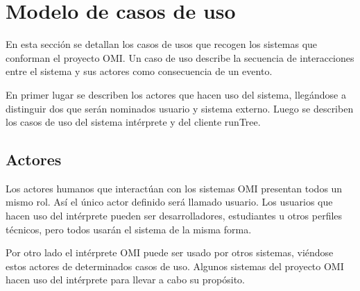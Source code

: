 \section{Modelo de casos de uso}
En esta sección se detallan los casos de usos que recogen los sistemas que conforman el proyecto OMI. 
Un caso de uso describe la secuencia de  interacciones entre el sistema y sus
actores como consecuencia de un evento. 

En primer lugar se describen los actores que hacen uso del sistema, llegándose a distinguir dos que serán nominados 
usuario y sistema externo. Luego se describen los casos de uso del sistema intérprete y del cliente runTree. 

\subsection{Actores}
Los actores humanos que interactúan con los sistemas OMI presentan todos un mismo rol. Así el 
único actor definido será llamado usuario.  Los usuarios que hacen uso del intérprete pueden ser desarrolladores,
estudiantes u otros perfiles técnicos, pero todos usarán el sistema de la misma forma.

Por otro lado el intérprete OMI puede ser usado por otros sistemas, viéndose estos actores de determinados casos
de uso. Algunos sistemas del proyecto OMI hacen uso del intérprete para llevar  a cabo su propósito.

